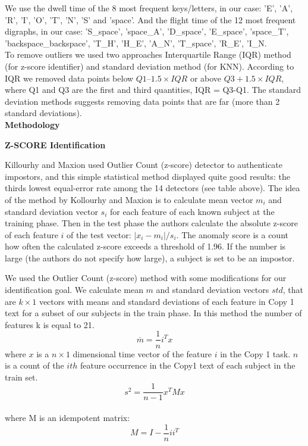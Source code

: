 \documentclass[12pt,a4]{article}
\begin{document}
We use the dwell time of the 8 most frequent keys/letters, in our case: 
'E', 'A', 'R', 'I', 'O', 'T', 'N', 'S' and 'space'. And the flight time of the 12 most frequent digraphs, in our case: 'S\_space', 'space\_A', 'D\_space', 'E\_space', 'space\_T', 'backspace\_backspace', 'T\_H', 'H\_E', 'A\_N', 'T\_space', 'R\_E', 'I\_N. \\

To remove outliers we used two approaches Interquartile Range (IQR) method (for z-score identifier) and standard deviation method (for KNN). According to IQR we removed data points below $Q1 – 1.5\times IQR$ or above $Q3 + 1.5 \times IQR$, where Q1 and Q3 are the first and third quantities, IQR = Q3-Q1. The standard deviation methods suggests removing data points that are far (more than 2 standard deviations).\\

\bigskip
\large\textbf{Methodology }
\bigskip

\medskip
\small\textbf{Z-SCORE Identification}
\medskip

\normalsize

Killourhy and Maxion \cite{killourhy2009comparing} used Outlier Count (z-score) detector to authenticate impostors, and this simple statistical method displayed quite good results: the thirds lowest equal-error rate among the 14 detectors (see table above).  The idea of the method by Kollourhy and Maxion is to calculate mean vector $m_i$ and standard deviation vector $s_i$ for each feature of each known subject at the training phase. Then in the test phase the authors calculate the absolute z-score of each feature $i$ of the test vector: $|x_i-m_i|/s_i$. The anomaly score is a count how often the calculated z-score exceeds a threshold of 1.96. If the number is large (the authors do not specify how large), a subject is set to be an impostor. 

We used the Outlier Count (z-score) method with some modifications for our identification goal. We calculate mean $m$ and standard deviation vectors $std$, that are $k \times 1$ vectors with means and standard deviations of each feature in Copy 1 text for a subset of our subjects in the train phase. In this method the number of features k is equal to 21.
$$
\overline{m} = \frac{1}{n}i^T x
$$
 where $x$ is a $n\times 1$ dimensional time vector of the feature $i$ in the Copy 1 task. $n$ is a count of the $ith$ feature occurrence in the Copy1 text of each subject in the train set. \\
$$
s^2 = \frac{1}{n-1} x^T M x
$$
\\
where M  is an idempotent matrix: 
$$
M = I - \frac{1}{n}ii^T
$$
\end{document}
